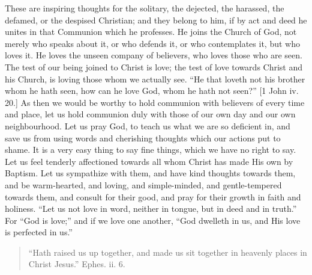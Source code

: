 These are inspiring thoughts for the solitary, the dejected, the
harassed, the defamed, or the despised Christian; and they belong to
him, if by act and deed he unites in that Communion which he
professes. He joins the Church of God, not merely who speaks about it,
or who defends it, or who contemplates it, but who loves it. He loves
the unseen company of believers, who loves those who are seen. The
test of our being joined to Christ is love; the test of love towards
Christ and his Church, is loving those whom we actually see. ``He
that loveth not his brother whom he hath seen, how can he love God,
whom he hath not seen?'' [1 John iv. 20.] As then we would be
worthy to hold communion with believers of every time and place, let
us hold communion duly with those of our own day and our own
neighbourhood. Let us pray God, to teach us what we are so deficient
in, and save us from using words and cherishing thoughts which our
actions put to shame. It is a very easy thing to say fine things,
which we have no right to say. Let us feel tenderly affectioned
towards all whom Christ has made His own by Baptism. Let us sympathize
with them, and have kind thoughts towards them, and be warm-hearted,
and loving, and simple-minded, and gentle-tempered towards them, and
consult for their good, and pray for their growth in faith and
holiness. ``Let us not love in word, neither in tongue, but in
deed and in truth.'' For ``God is love;'' and if we love
one another, ``God dwelleth in us, and His love is perfected in
us.''


\begin{quote}

``Hath raised us up together, and made us sit together in
heavenly places in Christ Jesus.'' Ephes. ii. 6.

\end{quote}

